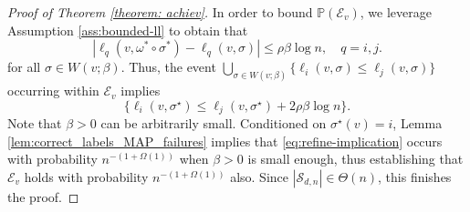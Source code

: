 \documentclass[11pt, a4paper]{amsart}
\newcommand{\1}{\mathbf{1}}
\theoremstyle{definition}
\theoremstyle{remark}
\theoremstyle{definition}
\begin{document}
\begin{proof}[Proof of Theorem \ref{theorem: achiev}]
In order to bound $\mathbb{P}(\mathcal{E}_v)$, we leverage Assumption \ref{ass:bounded-ll} to obtain that 
\begin{equation*}
    |\ell_q(v, \omega^* \circ \sigma^*) - \ell_q(v, \sigma)| \leq \rho \beta \log n,\quad q=i,j.
\end{equation*}
for all $\sigma \in W(v; \beta)$. Thus, the event
$\bigcup_{\sigma \in W(v; \beta)}  \{\ell_i(v, \sigma) \leq \ell_j(v, \sigma) \}$ occurring within $\mathcal{E}_v$ implies 
\begin{equation}
\{\ell_i(v,\sigma^{\star}) \leq \ell_j(v, \sigma^{\star}) + 2 \rho \beta \log n\}. \label{eq:refine-implication}
\end{equation} 
Note that $\beta > 0$ can be arbitrarily small.
Conditioned on $\sigma^{\star}(v) = i$, Lemma \ref{lem:correct_labels_MAP_failures} implies that \eqref{eq:refine-implication} occurs with probability $n^{-(1 + \Omega(1))}$ when $\beta > 0$ is small enough, thus establishing that $\mathcal{E}_v$ holds with probability $n^{-(1 + \Omega(1))}$ also. Since $|\mathcal S_{d,n}| \in \Theta(n)$, this finishes the proof.
\end{proof}
\end{document}
